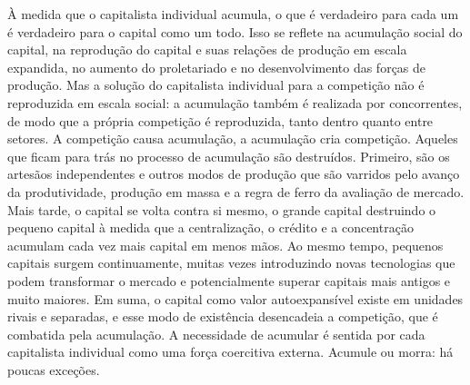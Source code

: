 À medida que o capitalista individual acumula, o que é verdadeiro para cada um é verdadeiro para o capital como um todo. Isso se reflete na acumulação social do capital, na reprodução do capital e suas relações de produção em escala expandida, no aumento do proletariado e no desenvolvimento das forças de produção. Mas a solução do capitalista individual para a competição não é reproduzida em escala social: a acumulação também é realizada por concorrentes, de modo que a própria competição é reproduzida, tanto dentro quanto entre setores. A competição causa acumulação, a acumulação cria competição. Aqueles que ficam para trás no processo de acumulação são destruídos. Primeiro, são os artesãos independentes e outros modos de produção que são varridos pelo avanço da produtividade, produção em massa e a regra de ferro da avaliação de mercado. Mais tarde, o capital se volta contra si mesmo, o grande capital destruindo o pequeno capital à medida que a centralização, o crédito e a concentração acumulam cada vez mais capital em menos mãos. Ao mesmo tempo, pequenos capitais surgem continuamente, muitas vezes introduzindo novas tecnologias que podem transformar o mercado e potencialmente superar capitais mais antigos e muito maiores. Em suma, o capital como valor autoexpansível existe em unidades rivais e separadas, e esse modo de existência desencadeia a competição, que é combatida pela acumulação. A necessidade de acumular é sentida por cada capitalista individual como uma força coercitiva externa. Acumule ou morra: há poucas exceções.
 \par 
